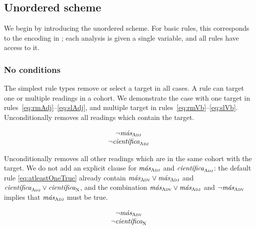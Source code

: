 
\subsection{Unordered scheme}

We begin by introducing the unordered scheme. For basic rules, this corresponds to the encoding in \cite{lager98}; each analysis is given a single variable, and all rules have access to it.

\subsubsection{No conditions} 

The simplest rule types remove or select a target in all cases. 
A rule can target one or multiple readings in a cohort. We demonstrate the case with one target in rules~\ref{eq:rmAdj}--\ref{eq:slAdj}, and multiple target in rules~\ref{eq:rmVb}--\ref{eq:slVb}. \\


 Unconditionally removes all readings which contain the target.

\begin{equation}
\begin{array}{c}
\neg{}\masAdj \\
\neg{}\cientificaAdj
\end{array}
\label{eq:rmAdj}
\end{equation}

 Unconditionally removes all other readings which are in the same cohort with the target.
We do not add an explicit clause for $\text{\em m\'{a}s}_{\text{\sc Adj}}$ and $\cientificaAdj$: the default rule \ref{eq:atleastOneTrue} already contain $\text{\em m\'{a}s}_{\text{\sc Adv}} \vee \text{\em m\'{a}s}_{\text{\sc Adj}}$ and $\cientificaAdj \vee \cientificaN$, and the combination $\text{\em m\'{a}s}_{\text{\sc Adv}} \vee \text{\em m\'{a}s}_{\text{\sc Adj}}$ and $\neg\text{\em m\'{a}s}_{\text{\sc Adv}}$ implies that $\text{\em m\'{a}s}_{\text{\sc Adj}}$ must be true. 

\begin{equation}
\begin{array}{c}
\neg{}\masAdv \\
\neg{}\cientificaN
\end{array}
\label{eq:slAdj}
\end{equation}

